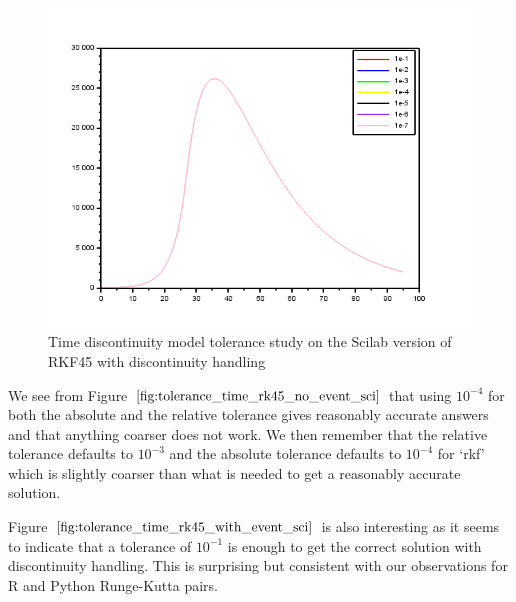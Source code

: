 \begin{figure}[h]
\centering
\includegraphics[width=0.7\linewidth]{./figures/tolerance_time_rk45_with_event_sci}
\caption{Time discontinuity model tolerance study on the Scilab version of RKF45 with discontinuity handling}
\label{fig:tolerance_time_rk45_with_event_sci}
\end{figure}

We see from Figure $\ref{fig:tolerance_time_rk45_no_event_sci}$ that using $10^{-4}$ for both the absolute and the relative tolerance gives reasonably accurate answers and that anything coarser does not work. We then remember that the relative tolerance defaults to $10^{-3}$ and the absolute tolerance defaults to $10^{-4}$ for `rkf' which is slightly coarser than what is needed to get a reasonably accurate solution.

Figure $\ref{fig:tolerance_time_rk45_with_event_sci}$ is also interesting as it seems to indicate that a tolerance of $10^{-1}$ is enough to get the correct solution with discontinuity handling. This is surprising but consistent with our observations for R and Python Runge-Kutta pairs.

